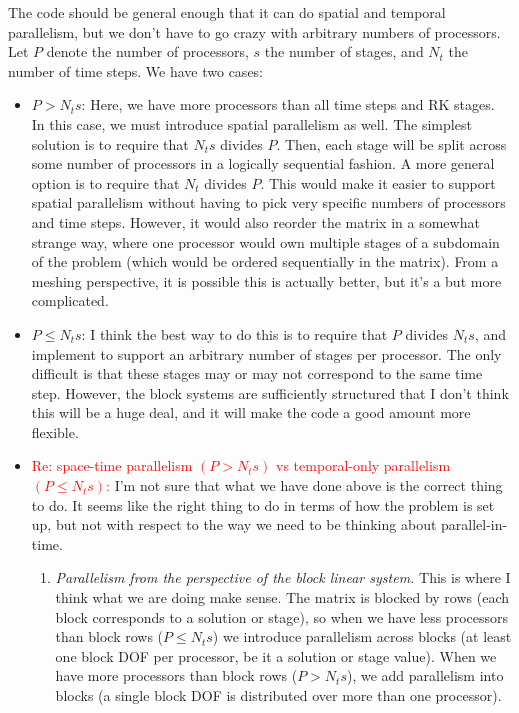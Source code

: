 \documentclass[a4paper,10pt]{article}
\begin{document}
The code should be general enough that it can do spatial and temporal parallelism, but we don't have to go crazy with
arbitrary numbers of processors. Let $P$ denote the number of processors, $s$ the number of stages, and 
$N_t$ the number of time steps. We have two cases:
%
\begin{itemize}
\item $P > N_ts$: Here, we have more processors than all time steps and RK stages. In this case, we must introduce
spatial parallelism as well. The simplest solution is to require that $N_ts$ divides $P$. Then, each stage will be split
across some number of processors in a logically sequential fashion. A more general option is to require that $N_t$
divides $P$. This would make it easier to support spatial parallelism without having to pick very specific numbers of
processors and time steps. However, it would also reorder the matrix in a somewhat strange way, where one processor
would own multiple stages of a subdomain of the problem (which would be ordered sequentially in the matrix). From a
meshing perspective, it is possible this is actually better, but it's a but more complicated.

\item $P \leq N_ts$: I think the best way to do this is to require that $P$ divides $N_ts$, and implement to support
an arbitrary number of stages per processor. The only difficult is that these stages may or may not correspond to
the same time step. However, the block systems are sufficiently structured that I don't think this will be a huge deal,
and it will make the code a good amount more flexible. 

\item \textcolor{red}{Re: space-time parallelism $(P > N_t s)$ vs temporal-only parallelism $(P \leq N_t s)$:} I'm not sure that what we have done above is the correct thing to do. It seems like the right thing to do in terms of how the problem is set up, but not with respect to the way we need to be thinking about parallel-in-time. 
\begin{enumerate}
\item \textit{Parallelism from the perspective of the block linear system.} This is where I think what we are doing make sense. The matrix is blocked by rows (each block corresponds to a solution or stage), so when we have less processors than block rows ($P \leq N_t s $) we introduce parallelism across blocks (at least one block DOF per processor, be it a solution or stage value). When we have more processors than block rows ($P > N_t s$), we add parallelism into blocks (a single block DOF is distributed over more than one processor).


\end{enumerate}
\end{itemize}
\end{document}
